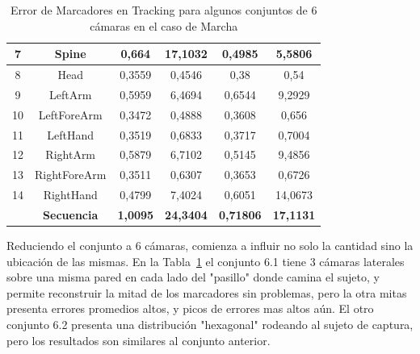 \begin{table}[h]
\begin{tabular}{c|c|c|c|c|c|}
\multicolumn{1}{|c|}{7} & Spine & 0,664 & 17,1032 & 0,4985 & 5,5806 \\ \hline
\multicolumn{1}{|c|}{8} & Head & 0,3559 & 0,4546 & 0,38 & 0,54 \\ \hline
\multicolumn{1}{|c|}{9} & LeftArm & 0,5959 & 6,4694 & 0,6544 & 9,2929 \\ \hline
\multicolumn{1}{|c|}{10} & LeftForeArm & 0,3472 & 0,4888 & 0,3608 & 0,656 \\ \hline
\multicolumn{1}{|c|}{11} & LeftHand & 0,3519 & 0,6833 & 0,3717 & 0,7004 \\ \hline
\multicolumn{1}{|c|}{12} & RightArm & 0,5879 & 6,7102 & 0,5145 & 9,4856 \\ \hline
\multicolumn{1}{|c|}{13} & RightForeArm & 0,3511 & 0,6307 & 0,3653 & 0,6726 \\ \hline
\multicolumn{1}{|c|}{14} & RightHand & 0,4799 & 7,4024 & 0,6051 & 14,0673 \\ \hline
 & \textbf{Secuencia} & \textbf{1,0095} & \textbf{24,3404} & \textbf{0,71806} & \textbf{17,1131} \\ \cline{2-6} 
\end{tabular}
\caption{Error de Marcadores en Tracking para algunos conjuntos de 6 cámaras en el caso de Marcha}
\label{error_captura_marcha_61_62_camaras}
\end{table}

Reduciendo el conjunto a 6 cámaras, comienza a influir no solo la cantidad sino la ubicación de las mismas. En la Tabla~\ref{error_captura_marcha_61_62_camaras} el conjunto 6.1 tiene 3 cámaras laterales sobre una misma pared en cada lado del "pasillo" donde camina el sujeto, y permite reconstruir la mitad de los marcadores sin problemas, pero la otra mitas presenta errores promedios altos, y picos de errores mas altos aún. El otro conjunto 6.2 presenta una distribución "hexagonal" rodeando al sujeto de captura, pero los resultados son similares al conjunto anterior.

